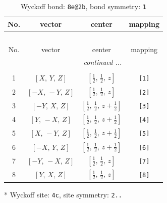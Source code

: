 \documentclass[fleqn,8pt]{jsarticle}
\begin{document}
\begin{longtable}{cccc}
\caption{Wyckoff bond: {\tt 8e@2b}, bond symmetry: {\tt 1}}
 \\
 \hline \hline
No. & vector & center & mapping \\ \hline \endfirsthead

\multicolumn{3}{l}{\tablename\ \thetable{}} \\
 \hline \hline
No. & vector & center & mapping \\ \hline \endhead

 \hline \hline
\multicolumn{3}{r}{\footnotesize\it continued ...} \\ \endfoot

 \hline \hline
\multicolumn{3}{r}{} \\ \endlastfoot

1 & $\left[ X,\, Y,\, Z \right]$ & $\left[ \frac{1}{2},\, \frac{1}{2},\, z \right]$ & {\tt [1]} \\ \hline
2 & $\left[ - X,\, - Y,\, Z \right]$ & $\left[ \frac{1}{2},\, \frac{1}{2},\, z \right]$ & {\tt [2]} \\ \hline
3 & $\left[ - Y,\, X,\, Z \right]$ & $\left[ \frac{1}{2},\, \frac{1}{2},\, z + \frac{1}{2} \right]$ & {\tt [3]} \\ \hline
4 & $\left[ Y,\, - X,\, Z \right]$ & $\left[ \frac{1}{2},\, \frac{1}{2},\, z + \frac{1}{2} \right]$ & {\tt [4]} \\ \hline
5 & $\left[ X,\, - Y,\, Z \right]$ & $\left[ \frac{1}{2},\, \frac{1}{2},\, z + \frac{1}{2} \right]$ & {\tt [5]} \\ \hline
6 & $\left[ - X,\, Y,\, Z \right]$ & $\left[ \frac{1}{2},\, \frac{1}{2},\, z + \frac{1}{2} \right]$ & {\tt [6]} \\ \hline
7 & $\left[ - Y,\, - X,\, Z \right]$ & $\left[ \frac{1}{2},\, \frac{1}{2},\, z \right]$ & {\tt [7]} \\ \hline
8 & $\left[ Y,\, X,\, Z \right]$ & $\left[ \frac{1}{2},\, \frac{1}{2},\, z \right]$ & {\tt [8]} \\
\end{longtable}
* Wyckoff site: {\tt 4c}, site symmetry: {\tt 2..}
\renewcommand{\arraystretch}{1.2}
\end{document}
